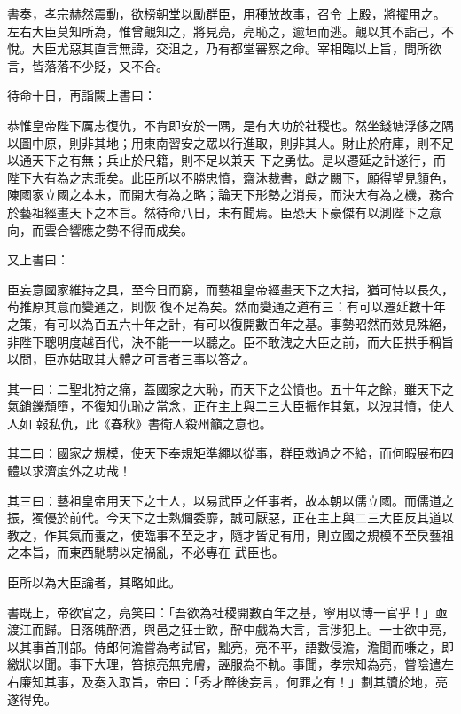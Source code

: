 \begin{pinyinscope}
 書奏，孝宗赫然震動，欲榜朝堂以勵群臣，用種放故事，召令
 上殿，將擢用之。左右大臣莫知所為，惟曾覿知之，將見亮，亮恥之，逾垣而逃。覿以其不詣己，不悅。大臣尤惡其直言無諱，交沮之，乃有都堂審察之命。宰相臨以上旨，問所欲言，皆落落不少貶，又不合。



 待命十日，再詣闕上書曰：



 恭惟皇帝陛下厲志復仇，不肯即安於一隅，是有大功於社稷也。然坐錢塘浮侈之隅以圖中原，則非其地；用東南習安之眾以行進取，則非其人。財止於府庫，則不足以通天下之有無；兵止於尺籍，則不足以兼天
 下之勇怯。是以遷延之計遂行，而陛下大有為之志乖矣。此臣所以不勝忠憤，齋沐裁書，獻之闕下，願得望見顏色，陳國家立國之本末，而開大有為之略；論天下形勢之消長，而決大有為之機，務合於藝祖經畫天下之本旨。然待命八日，未有聞焉。臣恐天下豪傑有以測陛下之意向，而雲合響應之勢不得而成矣。



 又上書曰：



 臣妄意國家維持之具，至今日而窮，而藝祖皇帝經畫天下之大指，猶可恃以長久，茍推原其意而變通之，則恢
 復不足為矣。然而變通之道有三：有可以遷延數十年之策，有可以為百五六十年之計，有可以復開數百年之基。事勢昭然而效見殊絕，非陛下聰明度越百代，決不能一一以聽之。臣不敢洩之大臣之前，而大臣拱手稱旨以問，臣亦姑取其大體之可言者三事以答之。



 其一曰：二聖北狩之痛，蓋國家之大恥，而天下之公憤也。五十年之餘，雖天下之氣銷鑠頹墮，不復知仇恥之當念，正在主上與二三大臣振作其氣，以洩其憤，使人人如
 報私仇，此《春秋》書衛人殺州籲之意也。



 其二曰：國家之規模，使天下奉規矩準繩以從事，群臣救過之不給，而何暇展布四體以求濟度外之功哉！



 其三曰：藝祖皇帝用天下之士人，以易武臣之任事者，故本朝以儒立國。而儒道之振，獨優於前代。今天下之士熟爛委靡，誠可厭惡，正在主上與二三大臣反其道以教之，作其氣而養之，使臨事不至乏才，隨才皆足有用，則立國之規模不至戾藝祖之本旨，而東西馳騁以定禍亂，不必專在
 武臣也。



 臣所以為大臣論者，其略如此。



 書既上，帝欲官之，亮笑曰：「吾欲為社稷開數百年之基，寧用以博一官乎！」亟渡江而歸。日落魄醉酒，與邑之狂士飲，醉中戲為大言，言涉犯上。一士欲中亮，以其事首刑部。侍郎何澹嘗為考試官，黜亮，亮不平，語數侵澹，澹聞而嗛之，即繳狀以聞。事下大理，笞掠亮無完膚，誣服為不軌。事聞，孝宗知為亮，嘗陰遣左右廉知其事，及奏入取旨，帝曰：「秀才醉後妄言，何罪之有！」劃其牘於地，亮遂得免。




\end{pinyinscope}
